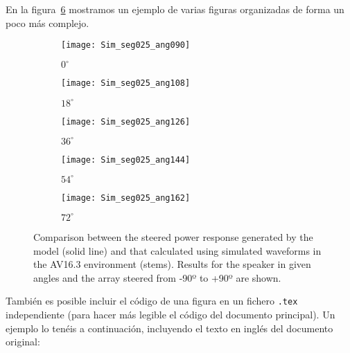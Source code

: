 En la figura~\ref{fig:Sim_angles} mostramos un ejemplo de varias
figuras organizadas de forma un poco más complejo.

\begin{figure}
  \centering
  \begin{subfigure}[b]{0.3\textwidth}
    \texttt{[image: Sim\_seg025\_ang090]}
    \caption{$0^{\circ}$}
    \label{fig:Sim_ang090}
  \end{subfigure}

  \begin{subfigure}[b]{0.3\textwidth}
    \texttt{[image: Sim\_seg025\_ang108]}
    \caption{$18^{\circ}$}
    \label{fig:Sim_ang108}
  \end{subfigure}
  \begin{subfigure}[b]{0.3\textwidth}
    \texttt{[image: Sim\_seg025\_ang126]}
    \caption{$36^{\circ}$}
    \label{fig:Sim_ang126}
  \end{subfigure}
  \begin{subfigure}[b]{0.3\textwidth}
    \texttt{[image: Sim\_seg025\_ang144]}
    \caption{$54^{\circ}$}
    \label{fig:Sim_ang144}
  \end{subfigure}

  \begin{subfigure}[b]{0.3\textwidth}
    \texttt{[image: Sim\_seg025\_ang162]}
    \caption{$72^{\circ}$}
    \label{fig:Sim_ang162}
  \end{subfigure}

  \caption{Comparison between the steered power response generated
    by the model (solid line) and that calculated using simulated
    waveforms in the AV16.3 environment (stems). Results for the
    speaker in given angles and the array steered from -90º to
    +90º are shown.}
  \label{fig:Sim_angles}
\end{figure}

También es posible incluir el código de una figura en un fichero
\texttt{.tex} independiente (para hacer más legible el código del
documento principal). Un ejemplo lo tenéis a continuación, incluyendo el
texto en inglés del documento original:

